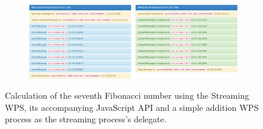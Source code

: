 \begin{figure}
\begin{subfigure}{\fibfigsize}
    \includegraphics[width = \linewidth]{figures/fibonacci-4.png}
  \end{subfigure}
  \caption{\label{fig:client}Calculation of the seventh Fibonacci number using the Streaming WPS, its accompanying JavaScript API and a simple addition WPS process as the streaming process's delegate.}
\end{figure}